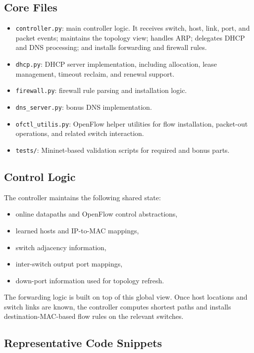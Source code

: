 \documentclass[11pt,a4paper]{article}
\begin{document}
\subsection{Core Files}

\begin{itemize}[leftmargin=1.5em]
    \item \texttt{controller.py}: main controller logic. It receives switch, host, link,
    port, and packet events; maintains the topology view; handles ARP; delegates DHCP and
    DNS processing; and installs forwarding and firewall rules.
    \item \texttt{dhcp.py}: DHCP server implementation, including allocation, lease
    management, timeout reclaim, and renewal support.
    \item \texttt{firewall.py}: firewall rule parsing and installation logic.
    \item \texttt{dns\_server.py}: bonus DNS implementation.
    \item \texttt{ofctl\_utilis.py}: OpenFlow helper utilities for flow installation,
    packet-out operations, and related switch interaction.
    \item \texttt{tests/}: Mininet-based validation scripts for required and bonus parts.
\end{itemize}

\subsection{Control Logic}

The controller maintains the following shared state:

\begin{itemize}[leftmargin=1.5em]
    \item online datapaths and OpenFlow control abstractions,
    \item learned hosts and IP-to-MAC mappings,
    \item switch adjacency information,
    \item inter-switch output port mappings,
    \item down-port information used for topology refresh.
\end{itemize}

The forwarding logic is built on top of this global view. Once host locations and switch
links are known, the controller computes shortest paths and installs destination-MAC-based
flow rules on the relevant switches.

\subsection{Representative Code Snippets}
\end{document}
